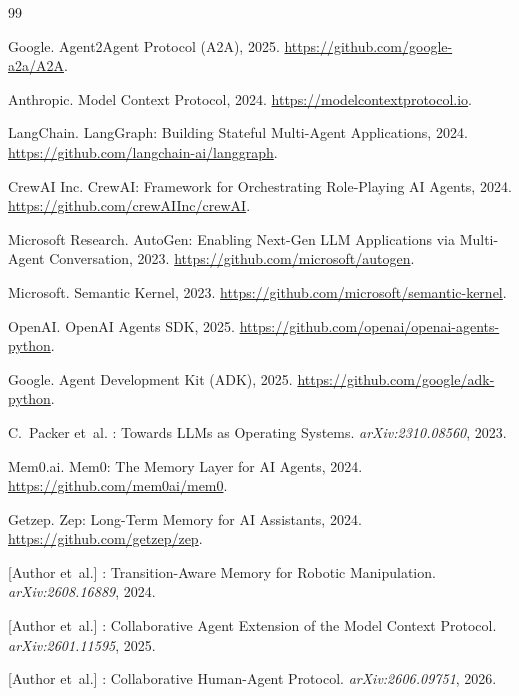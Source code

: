 \documentclass[11pt]{article}
\begin{document}

\begin{thebibliography}{99}

Google.
\newblock Agent2Agent Protocol (A2A), 2025.
\newblock \url{https://github.com/google-a2a/A2A}.

Anthropic.
\newblock Model Context Protocol, 2024.
\newblock \url{https://modelcontextprotocol.io}.

LangChain.
\newblock LangGraph: Building Stateful Multi-Agent Applications, 2024.
\newblock \url{https://github.com/langchain-ai/langgraph}.

CrewAI Inc.
\newblock CrewAI: Framework for Orchestrating Role-Playing AI Agents, 2024.
\newblock \url{https://github.com/crewAIInc/crewAI}.

Microsoft Research.
\newblock AutoGen: Enabling Next-Gen LLM Applications via Multi-Agent
  Conversation, 2023.
\newblock \url{https://github.com/microsoft/autogen}.

Microsoft.
\newblock Semantic Kernel, 2023.
\newblock \url{https://github.com/microsoft/semantic-kernel}.

OpenAI.
\newblock OpenAI Agents SDK, 2025.
\newblock \url{https://github.com/openai/openai-agents-python}.

Google.
\newblock Agent Development Kit (ADK), 2025.
\newblock \url{https://github.com/google/adk-python}.

C.~Packer et~al.
: Towards LLMs as Operating Systems.
\newblock \emph{arXiv:2310.08560}, 2023.

Mem0.ai.
\newblock Mem0: The Memory Layer for AI Agents, 2024.
\newblock \url{https://github.com/mem0ai/mem0}.

Getzep.
\newblock Zep: Long-Term Memory for AI Assistants, 2024.
\newblock \url{https://github.com/getzep/zep}.

[Author et~al.]
: Transition-Aware Memory for Robotic Manipulation.
\newblock \emph{arXiv:2608.16889}, 2024.

[Author et~al.]
: Collaborative Agent Extension of the Model Context
  Protocol.
\newblock \emph{arXiv:2601.11595}, 2025.

[Author et~al.]
: Collaborative Human-Agent Protocol.
\newblock \emph{arXiv:2606.09751}, 2026.


\end{thebibliography}
\end{document}
